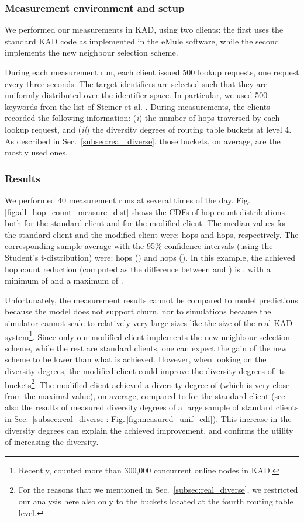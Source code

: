 \documentclass[10pt, conference, compsocconf, letterpaper]{IEEEtran}
\begin{document}
\vspace{3pt}
\subsubsection{\textbf{Measurement environment and setup}} We performed our measurements in KAD, using two clients: the first uses the standard KAD code as implemented in the eMule software, while the second implements the new neighbour selection scheme. 

During each measurement run, each client issued 500 lookup requests, one request every three seconds. The target identifiers are selected such that they are uniformly distributed over the identifier space. In particular, we used 500 keywords from the list of Steiner et al. \cite{steiner10evaluating}. During measurements, the clients recorded the following information: (\emph{i}) the number of hops traversed by each lookup request, and (\emph{ii}) the diversity degrees of routing table buckets at level 4. As described in Sec.~\ref{subsec:real_diverse}, those buckets, on average, are the mostly used ones.

\vspace{3pt}
\subsubsection{\textbf{Results}} 

We performed 40 measurement runs at several times of the day. Fig.\,\ref{fig:all_hop_count_measure_dist} shows the CDFs of hop count distributions both for the standard client and for the modified client. The median values for the standard client and the modified client were:  hops and  hops, respectively. The corresponding sample average with the 95\% confidence intervals (using the Student's t-distribution) were:  hops () and  hops (). In this example, the achieved hop count reduction (computed as the difference between  and ) is , with a minimum of  and a maximum of . 

Unfortunately, the measurement results cannot be compared to model predictions because the model does not support churn, nor to simulations because the simulator cannot scale to relatively very large sizes like the size of the real KAD system\footnote{Recently, \cite{salah13capturing} counted more than 300,000 concurrent online nodes in KAD.}. Since only our modified client implements the new neighbour selection scheme, while the rest are standard clients, one can expect the gain of the new scheme to be lower than what is achieved. However, when looking on the diversity degrees, the modified client could improve the diversity degrees of its buckets\footnote{For the reasons that we mentioned in Sec.~\ref{subsec:real_diverse}, we restricted our analysis here also only to the buckets located at the fourth routing table level.}: The modified client achieved a diversity degree of  (which is very close from the maximal value), on average, compared to  for the standard client (see also the results of measured diversity degrees of a large sample of standard clients in Sec.~\ref{subsec:real_diverse}: Fig.\,\ref{fig:measured_unif_cdf}). This increase in the diversity degrees can explain the achieved improvement, and confirms the utility of increasing the diversity. 
\end{document}

